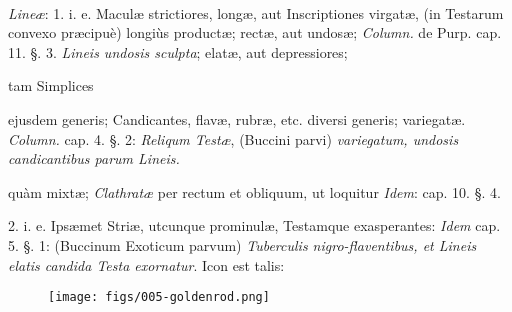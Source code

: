 \documentclass[a4paper, 11pt, oneside, polutonikogreek, german]{article}
\begin{document}
\paragraph{}
\emph{Lineæ}: 1. i. e. Maculæ strictiores, longæ, aut Inscriptiones virgatæ, (in Testarum convexo præcipuè) longiùs productæ; rectæ, aut undosæ; \emph{Column.} de Purp. cap. 11. §. 3. \emph{Lineis undosis sculpta}; elatæ, aut depressiores;

tam Simplices

ejusdem generis; Candicantes, flavæ, rubræ, etc. diversi generis; variegatæ. \emph{Column.} cap. 4. §. 2: \emph{Reliqum Testæ}, (Buccini parvi) \emph{variegatum, undosis candicantibus parum Lineis.}

quàm mixtæ; \emph{Clathratæ} per rectum et obliquum, ut loquitur \emph{Idem}: cap. 10. §. 4.

2. i. e. Ipsæmet Striæ, utcunque prominulæ, Testamque exasperantes: \emph{Idem} cap. 5. §. 1: (Buccinum Exoticum parvum) \emph{Tuberculis nigro-flaventibus, et Lineis elatis candida Testa exornatur}. Icon est talis:

\begin{figure}[H]
\centering
\texttt{[image: figs/005-goldenrod.png]}
\end{figure}
\end{document}
